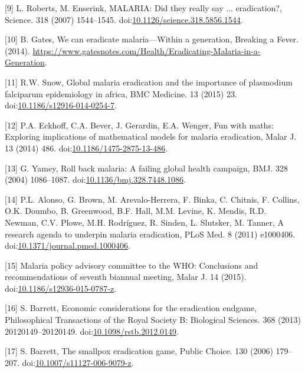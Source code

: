 \documentclass[]{article}
\begin{document}
\hypertarget{ref-Roberts2007}{}
{[}9{]} L. Roberts, M. Enserink, MALARIA: Did they really say ...
eradication?, Science. 318 (2007) 1544--1545.
doi:\href{https://doi.org/10.1126/science.318.5856.1544}{10.1126/science.318.5856.1544}.

\hypertarget{ref-Gates2014}{}
{[}10{]} B. Gates, We can eradicate malaria---Within a generation,
Breaking a Fever. (2014).
\url{https://www.gatesnotes.com/Health/Eradicating-Malaria-in-a-Generation}.

\hypertarget{ref-Snow2015}{}
{[}11{]} R.W. Snow, Global malaria eradication and the importance of
plasmodium falciparum epidemiology in africa, BMC Medicine. 13 (2015)
23.
doi:\href{https://doi.org/10.1186/s12916-014-0254-7}{10.1186/s12916-014-0254-7}.

\hypertarget{ref-Eckhoff2014}{}
{[}12{]} P.A. Eckhoff, C.A. Bever, J. Gerardin, E.A. Wenger, Fun with
maths: Exploring implications of mathematical models for malaria
eradication, Malar J. 13 (2014) 486.
doi:\href{https://doi.org/10.1186/1475-2875-13-486}{10.1186/1475-2875-13-486}.

\hypertarget{ref-Yamey2004}{}
{[}13{]} G. Yamey, Roll back malaria: A failing global health campaign,
BMJ. 328 (2004) 1086--1087.
doi:\href{https://doi.org/10.1136/bmj.328.7448.1086}{10.1136/bmj.328.7448.1086}.

\hypertarget{ref-Alonso2011}{}
{[}14{]} P.L. Alonso, G. Brown, M. Arevalo-Herrera, F. Binka, C.
Chitnis, F. Collins, O.K. Doumbo, B. Greenwood, B.F. Hall, M.M. Levine,
K. Mendis, R.D. Newman, C.V. Plowe, M.H. Rodríguez, R. Sinden, L.
Slutsker, M. Tanner, A research agenda to underpin malaria eradication,
PLoS Med. 8 (2011) e1000406.
doi:\href{https://doi.org/10.1371/journal.pmed.1000406}{10.1371/journal.pmed.1000406}.

\hypertarget{ref-WHO2015}{}
{[}15{]} Malaria policy advisory committee to the WHO: Conclusions and
recommendations of seventh biannual meeting, Malar J. 14 (2015).
doi:\href{https://doi.org/10.1186/s12936-015-0787-z}{10.1186/s12936-015-0787-z}.

\hypertarget{ref-Barrett2013}{}
{[}16{]} S. Barrett, Economic considerations for the eradication
endgame, Philosophical Transactions of the Royal Society B: Biological
Sciences. 368 (2013) 20120149--20120149.
doi:\href{https://doi.org/10.1098/rstb.2012.0149}{10.1098/rstb.2012.0149}.

\hypertarget{ref-Barrett_2006}{}
{[}17{]} S. Barrett, The smallpox eradication game, Public Choice. 130
(2006) 179--207.
doi:\href{https://doi.org/10.1007/s11127-006-9079-z}{10.1007/s11127-006-9079-z}.
\end{document}
